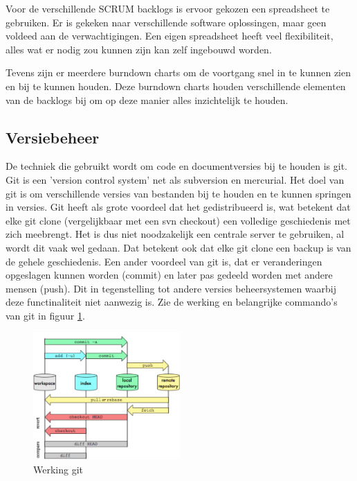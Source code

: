 \documentclass[]{article}
\begin{document}
Voor de verschillende SCRUM backlogs is ervoor gekozen een spreadsheet te
gebruiken. Er is gekeken naar verschillende software oplossingen, maar geen
voldeed aan de verwachtigingen. Een eigen spreadsheet heeft veel
flexibiliteit, alles wat er nodig zou kunnen zijn kan zelf ingebouwd worden.

Tevens zijn er meerdere burndown charts om de voortgang snel in te kunnen
zien en bij te kunnen houden. Deze burndown charts houden verschillende
elementen van de backlogs bij om op deze manier alles inzichtelijk te
houden.

\newpage
\subsection{Versiebeheer}

De techniek die gebruikt wordt om code en documentversies bij te houden is
git. Git is een 'version control system' net als subversion en
mercurial. Het doel van git is om verschillende versies van bestanden bij
te houden en te kunnen springen in versies. Git heeft als grote voordeel
dat het gedistribueerd is, wat betekent dat elke git clone (vergelijkbaar
met een svn checkout) een volledige geschiedenis met zich meebrengt. Het is
dus niet noodzakelijk een centrale server te gebruiken, al wordt dit vaak
wel gedaan. Dat betekent ook dat elke git clone een backup is van de gehele
geschiedenis. Een ander voordeel van git is, dat er veranderingen opgeslagen
kunnen worden (commit) en later pas gedeeld worden met andere mensen (push). Dit in
tegenstelling tot andere versies beheersystemen waarbij deze functinaliteit niet
aanwezig is. Zie de werking en belangrijke commando's van git in figuur \ref{git}.

\begin{figure}[htpb]
  \begin{center}
    \includegraphics[width=0.50\textwidth]{git_diagram.pdf}
  \end{center}
  \caption{Werking git}
  \label{git}
\end{figure}
\end{document}
